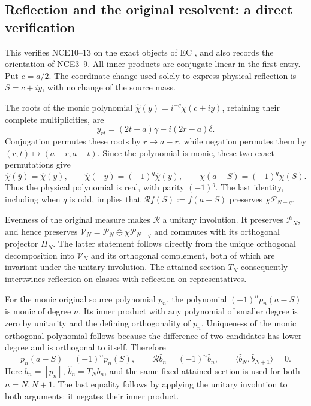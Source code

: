 \subsection{Reflection and the original resolvent: a direct verification}

This verifies NCE10--13 on the exact objects of EC
\cite{prog:EC}, and also records the orientation of NCE3--9.
All inner products are conjugate linear in the first entry.
Put \(c=a/2\).  The coordinate change used solely to express physical
reflection is \(S=c+iy\), with no change of the source mass.

The roots of the monic polynomial
\(\widehat\chi(y)=i^{-q}\chi(c+iy)\), retaining their complete
multiplicities, are
\[
 y_{rt}=(2t-a)\gamma-i(2r-a)\delta .
\]
Conjugation permutes these roots by \(r\mapsto a-r\), while
negation permutes them by \((r,t)\mapsto(a-r,a-t)\).
Since the polynomial is monic, these two exact permutations give
\begin{equation}
 \overline{\widehat\chi(\bar y)}=\widehat\chi(y),\qquad
 \widehat\chi(-y)=(-1)^q\widehat\chi(y),\qquad
 \chi(a-S)=(-1)^q\chi(S).
 \tag{ECR1}
\end{equation}
Thus the physical polynomial is real, with parity \((-1)^q\).
The last identity, including when \(q\) is odd, implies that
\(\mathscr R f(S):=f(a-S)\) preserves
\(\chi\mathcal P_{N-q}\).

Evenness of the original measure makes \(\mathscr R\) a unitary
involution.  It preserves \(\mathcal P_N\), and hence preserves
\(\mathcal V_N=\mathcal P_N\ominus\chi\mathcal P_{N-q}\) and commutes
with its orthogonal projector \(\Pi_N\).
The latter statement follows directly from the unique orthogonal
decomposition into \(\mathcal V_N\) and its orthogonal complement,
both of which are invariant under the unitary involution.
The attained section \(T_N\) consequently intertwines reflection on
classes with reflection on representatives.

For the monic original source polynomial \(p_n\), the polynomial
\((-1)^np_n(a-S)\) is monic of degree \(n\).
Its inner product with any polynomial of smaller degree is zero by
unitarity and the defining orthogonality of \(p_n\).
Uniqueness of the monic orthogonal polynomial follows because the
difference of two candidates has lower degree and is orthogonal to
itself.  Therefore
\begin{equation}
 p_n(a-S)=(-1)^np_n(S),\qquad
 \mathscr R\widehat b_n=(-1)^n\widehat b_n,\qquad
 \langle\widehat b_N,\widehat b_{N+1}\rangle=0 .
 \tag{ECR2}
\end{equation}
Here \(b_n=[p_n]\), \(\widehat b_n=T_Nb_n\), and the same fixed
attained section is used for both \(n=N,N+1\).
The last equality follows by applying the unitary involution to both
arguments: it negates their inner product.

